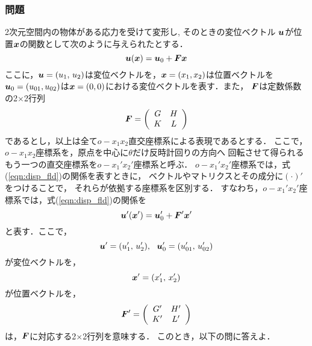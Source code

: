 \documentclass[10pt,a4j]{jarticle}
\begin{document}
\subsubsection*{問題}
2次元空間内の物体がある応力を受けて変形し, そのときの変位ベクトル
$\mbox{\boldmath $u$}$が位置$\mbox{\boldmath $x$}$の関数として次のように与えられたとする．
\begin{equation}
	\mbox{\boldmath $u$}(\mbox{\boldmath $x$})=\mbox{\boldmath $u$}_0 + \mbox{\boldmath $F$}\mbox{\boldmath $x$}
	\label{eqn:disp_fld}
\end{equation}
ここに，$\mbox{\boldmath $u$}=(u_1,\, u_2)$は変位ベクトルを，$\mbox{\boldmath $x$}=(x_1, x_2)$は位置ベクトルを
$\mbox{\boldmath $u$}_0=(u_{01},u_{02})$は$\mbox{\boldmath $x$}=(0,0)$における変位ベクトルを表す．また，
$\mbox{\boldmath $F$}$は定数係数の2$\times$2行列
\begin{equation}
	\mbox{\boldmath $F$}=
	\left(
	\begin{array}{cc}
		G & H \\
		K & L
	\end{array}
	\label{eqn:Fmat}
	\right)
\end{equation}
であるとし，以上は全て$o-x_1x_2$直交座標系による表現であるとする．
ここで，$o-x_1x_2$座標系を，原点を中心に$\theta$だけ反時計回りの方向へ
回転させて得られるもう一つの直交座標系を$o-x_1'x_2'$座標系と呼ぶ．
$o-x_1'x_2'$座標系では，式(\ref{eqn:disp_fld})の関係を表すときに，
ベクトルやマトリクスとその成分に$(\cdot)'$をつけることで，
それらが依拠する座標系を区別する．
すなわち，$o-x_1'x_2'$座標系では，式(\ref{eqn:disp_fld})の関係を
\begin{equation}
	\mbox{\boldmath $u$}'(\mbox{\boldmath $x$}')=\mbox{\boldmath $u$}'_0 + \mbox{\boldmath $F$}'\mbox{\boldmath $x$}'
	\label{eqn:disp_fld2}
\end{equation}
と表す．ここで，
\begin{equation}
	\fat{u}'=(u_1',\, u_2'), \ \ 
	\fat{u}_0'=(u_{01}',\, u_{02}')
\end{equation}
が変位ベクトルを，
\begin{equation}
	\mbox{\boldmath $x$}'=(x_1',\, x_2')
\end{equation}
が位置ベクトルを，
\begin{equation}
	\mbox{\boldmath $F$}'=
	\left(
	\begin{array}{cc}
		G' & H' \\
		K' & L'
	\end{array}
	\label{eqn:Fmat2}
	\right)
\end{equation}
は，$\mbox{\boldmath $F$}$に対応する2$\times$2行列を意味する．
このとき，以下の問に答えよ．
\end{document}
